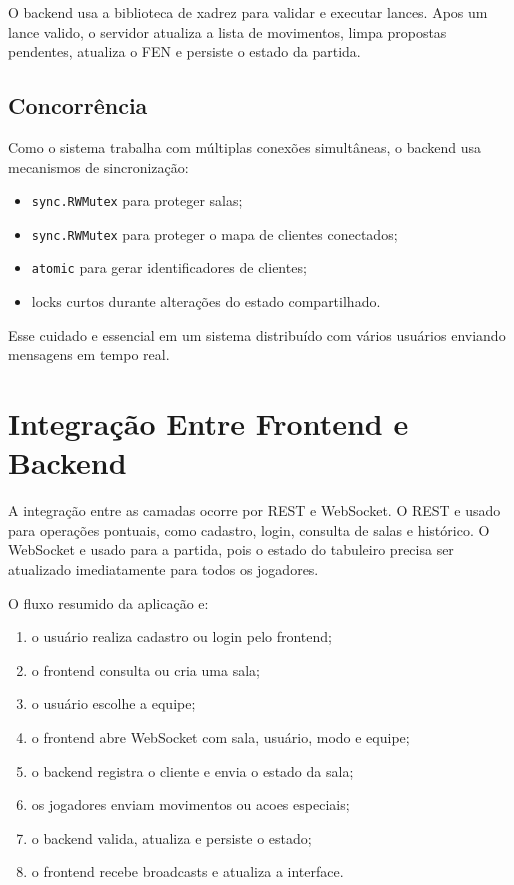 \documentclass[12pt]{article}
\begin{document}
O backend usa a biblioteca de xadrez para validar e executar lances. Apos um lance valido, o servidor atualiza a lista de movimentos, limpa propostas pendentes, atualiza o FEN e persiste o estado da partida.

\subsection{Concorrência}

Como o sistema trabalha com múltiplas conexões simultâneas, o backend usa mecanismos de sincronização:

\begin{itemize}
    \item \texttt{sync.RWMutex} para proteger salas;
    \item \texttt{sync.RWMutex} para proteger o mapa de clientes conectados;
    \item \texttt{atomic} para gerar identificadores de clientes;
    \item locks curtos durante alterações do estado compartilhado.
\end{itemize}

Esse cuidado e essencial em um sistema distribuído com vários usuários enviando mensagens em tempo real.

\section{Integração Entre Frontend e Backend}

A integração entre as camadas ocorre por REST e WebSocket. O REST e usado para operações pontuais, como cadastro, login, consulta de salas e histórico. O WebSocket e usado para a partida, pois o estado do tabuleiro precisa ser atualizado imediatamente para todos os jogadores.

O fluxo resumido da aplicação e:

\begin{enumerate}
    \item o usuário realiza cadastro ou login pelo frontend;
    \item o frontend consulta ou cria uma sala;
    \item o usuário escolhe a equipe;
    \item o frontend abre WebSocket com sala, usuário, modo e equipe;
    \item o backend registra o cliente e envia o estado da sala;
    \item os jogadores enviam movimentos ou acoes especiais;
    \item o backend valida, atualiza e persiste o estado;
    \item o frontend recebe broadcasts e atualiza a interface.
\end{enumerate}
\end{document}
